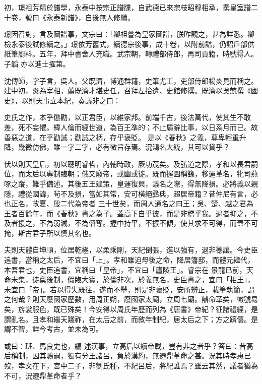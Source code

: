 \begin{pinyinscope}
 初，璟祖芳精於譜學，永泰中按宗正譜牒，自武德已來宗枝昭穆相承，撰皇室譜二十卷，號曰《永泰新譜》，自後無人修續。



 璟因召對，言及圖譜事，文宗曰：「卿祖嘗為皇家圖譜，朕昨觀之，甚為詳悉。卿檢永泰後試修續之。」璟依芳舊式，續德宗後事，成十卷，以附前譜，仍詔戶部供紙筆廚料。五年，拜中書舍人充職。武宗朝，轉禮部侍郎，再司貢籍，時號得人。子韜
 亦以進士擢第。



 沈傳師，字子言，吳人。父既濟，博通群籍，史筆尤工，吏部侍郎楊炎見而稱之。建中初，炎為宰相，薦既濟才堪史任，召拜左拾遺、史館修撰。既濟以吳兢撰《國史》，以則天事立本紀，奏議非之曰：



 史氏之作，本乎懲勸，以正君臣，以維家邦。前端千古，後法萬代，使其生不敢差，死不妄懼。緯人倫而經世道，為百王準的；不止屬辭比事，以日系月而已。故善惡之道，在乎勸誡；勸誡之柄，存乎褒貶。
 是以《春秋》之義，尊卑輕重升降，幾微仿佛，雖一字二字，必有微旨存焉。況鴻名大統，其可以貸乎？



 伏以則天皇后，初以聰明睿哲，內輔時政，厥功茂矣。及弘道之際，孝和以長君嗣位，而太后以專制臨朝；俄又廢帝，或幽或徙。既而握圖稱籙，移運革名，牝司燕啄之蹤，難乎備述。其後五王建策，皇運復興，議名之際，得無降損。必將義以親隱，禮從國諱，茍不及損，當如其常，安可橫絕彞典，超居帝籍？昔仲尼有言，必也正名，故夏、殷二代為帝者
 三十世矣，而周人通名之曰王；吳、楚、越之君為王者百餘年，而《春秋》書之為子。蓋高下自乎彼，而是非稽乎我。過者抑之，不及者援之，不為弱減，不為僭奪。握中持平，不振不傾，使其求不可得，而蓋不可掩，斯古君子所以慎其名也。



 夫則天體自坤順，位居乾極，以柔乘剛，天紀倒張，進以強有，退非德讓。今史臣追書，當稱之太后，不宜曰「上」。孝和雖迫母後之命，降居籓邸，而體元繼代，本吾君也，史臣追書，宜稱曰「皇帝」，不宜曰「廬陵王」。睿宗在
 景龍已前，天命未集，徒稟後制，假臨大寶，於倫非次，於義無名，史臣書之，宜曰「相王」，未宜曰「帝」。若以得失既往，遂而不舉，則是非褒貶，安所辨正，載筆執簡，謂之何哉？則天廢國家歷數，用周正朔，廢國家太廟，立周七廟。鼎命革矣，徽號易矣，旂裳服色，既已殊矣！今安得以周氏年歷而列為《唐書》帝紀？征諸禮經，是謂亂名。且孝和繼天踐祚，在太后之前，而敘年制紀，居太后之下；方之躋僖。是謂不智，詳今考古，並未為可。



 或曰：班、馬良史也，編
 述漢事，立高后以續帝載，豈有非之者乎？答曰：昔高后稱制，因其曠嗣，獨有分王諸呂，負於漢約，無遷鼎革命之甚。況其時孝惠已歿，孝文在下，宮中二子，非劉氏種，不紀呂后，將紀誰焉？雖云其然，議者猶為不可，況遷鼎革命者乎？




\end{pinyinscope}

